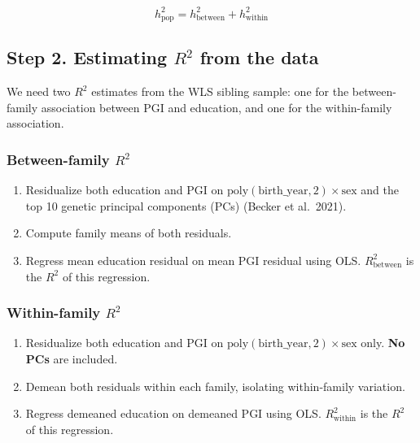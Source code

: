 \documentclass[
]{article}
\providecommand{\tightlist}{%
  \setlength{\itemsep}{0pt}\setlength{\parskip}{0pt}}
\begin{document}
\[h^2_\text{pop} = h^2_\text{between} + h^2_\text{within}\]


\subsection{\texorpdfstring{Step 2. Estimating \(R^2\) from the
data}{Step 2. Estimating R\^{}2 from the data}}\label{step-2.-estimating-r2-from-the-data}

We need two \(R^2\) estimates from the WLS sibling sample: one for the
between-family association between PGI and education, and one for the
within-family association.

\subsubsection{\texorpdfstring{Between-family
\(R^2\)}{Between-family R\^{}2}}\label{between-family-r2}

\begin{enumerate}
\def\labelenumi{\arabic{enumi}.}
\tightlist
\item
  Residualize both education and PGI on
  \(\text{poly}(\text{birth\_year}, 2) \times \text{sex}\) and the top
  10 genetic principal components (PCs) (Becker et al.~2021).
\item
  Compute family means of both residuals.
\item
  Regress mean education residual on mean PGI residual using OLS.
  \(R^2_\text{between}\) is the \(R^2\) of this regression.
\end{enumerate}

\subsubsection{\texorpdfstring{Within-family
\(R^2\)}{Within-family R\^{}2}}\label{within-family-r2}

\begin{enumerate}
\def\labelenumi{\arabic{enumi}.}
\tightlist
\item
  Residualize both education and PGI on
  \(\text{poly}(\text{birth\_year}, 2) \times \text{sex}\) only.
  \textbf{No PCs} are included.
\item
  Demean both residuals within each family, isolating within-family
  variation.
\item
  Regress demeaned education on demeaned PGI using OLS.
  \(R^2_\text{within}\) is the \(R^2\) of this regression.
\end{enumerate}
\end{document}
